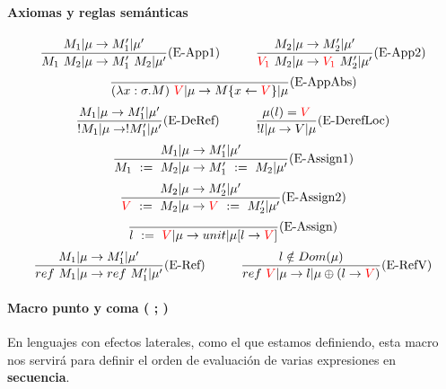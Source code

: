 \paragraph{Axiomas y reglas semánticas}
\begin{equation*}
	\frac{M_1|\mu\to M'_1|\mu'}{M_1~M_2|\mu\to M'_1~M_2|\mu'}(\text{E-App1})\hspace*{1cm}\frac{M_2|\mu\to M'_2|\mu'}{\color{red}V_1\color{black}~M_2|\mu\to \color{red}V_1\color{black}~M'_2|\mu'}(\text{E-App2})
\end{equation*}
\vspace*{5mm}
\begin{equation*}
	\frac{}{(\lambda x: \sigma . M)~\color{red}V\color{black}|\mu\to M\{x\leftarrow\color{red}V\color{black}\}|\mu}(\text{E-AppAbs})
\end{equation*}
\vspace*{5mm}
\begin{equation*}
	\frac{M_1|\mu\to M'_1|\mu'}{!M_1|\mu\to !M_1'|\mu'}(\text{E-DeRef})\hspace*{1cm}
	\frac{\mu(l) = \color{red}V\color{black}}{!l|\mu\to V|\mu}(\text{E-DerefLoc})
\end{equation*}
\vspace*{5mm}
\begin{equation*}
	\frac{M_1|\mu\to M'_1|\mu'}{M_1~:=~M_2|\mu\to M'_1~:=~M_2|\mu'}(\text{E-Assign1})
\end{equation*}
\vspace*{5mm}
\begin{equation*}
	\frac{M_2|\mu\to M'_2|\mu'}{\color{red}V\color{black}~:=~M_2|\mu\to \color{red}V\color{black}~:=~M'_2|\mu'}(\text{E-Assign2})
\end{equation*}
\vspace*{5mm}
\begin{equation*}
	\frac{}{l~:=~\color{red}V\color{black}|\mu\to unit|\mu[l\to \color{red}V\color{black}]}(\text{E-Assign})
\end{equation*}
\vspace*{5mm}
\begin{equation*}
	\frac{M_1|\mu\to M'_1|\mu'}{ref~M_1|\mu\to ref~M'_1|\mu'}(\text{E-Ref})\hspace*{1cm}
	\frac{l\notin Dom(\mu)}{ref~\color{red}V\color{black}|\mu\to l|\mu\oplus(l\to \color{red}V\color{black})}(\text{E-RefV})
\end{equation*}

\paragraph{Macro punto y coma ( ; )} En lenguajes con efectos laterales, como el que estamos definiendo, esta macro nos servirá para definir el orden de evaluación de varias expresiones en \textbf{secuencia}.


